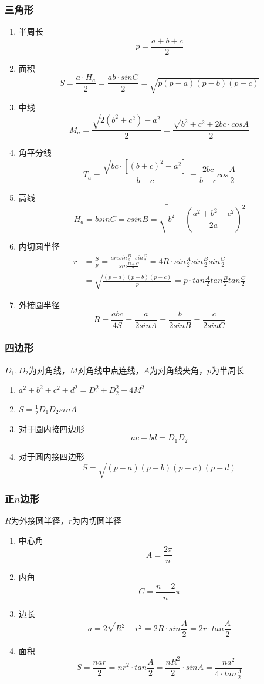 \documentclass[a4paper]{article}
\begin{document}
\subsubsection{三角形}

\begin{enumerate}
	\item 半周长
		$$p=\frac{a+b+c}{2}$$
	\item 面积
		$$S=\frac{a \cdot H_a}{2}=\frac{ab \cdot sinC}{2}=\sqrt{p(p-a)(p-b)(p-c)}$$
	\item 中线
		$$M_a=\frac{\sqrt{2(b^2+c^2)-a^2}}{2}=\frac{\sqrt{b^2+c^2+2bc \cdot cosA}}{2}$$
	\item 角平分线 
		$$T_a=\frac{\sqrt{bc \cdot [(b+c)^2-a^2]}}{b+c}=\frac{2bc}{b+c}cos\frac{A}{2}$$
	\item 高线
		$$H_a=bsinC=csinB=\sqrt{b^2-(\frac{a^2+b^2-c^2}{2a})^2}$$
	\item 内切圆半径
		\begin{align*}
			r&=\frac{S}{p}=\frac{arcsin\frac{B}{2} \cdot sin\frac{C}{2}}{sin\frac{B+C}{2}}=4R \cdot sin\frac{A}{2}sin\frac{B}{2}sin\frac{C}{2}\\
			&=\sqrt{\frac{(p-a)(p-b)(p-c)}{p}}=p \cdot tan\frac{A}{2}tan\frac{B}{2}tan\frac{C}{2}
		\end{align*}
	\item 外接圆半径
		$$R=\frac{abc}{4S}=\frac{a}{2sinA}=\frac{b}{2sinB}=\frac{c}{2sinC}$$
\end{enumerate}

\subsubsection{四边形}

$D_1, D_2$为对角线，$M$对角线中点连线，$A$为对角线夹角，$p$为半周长
\begin{enumerate}
	\item $a^2+b^2+c^2+d^2=D_1^2+D_2^2+4M^2$
	\item $S=\frac{1}{2}D_1D_2sinA$
	\item 对于圆内接四边形
		$$ac+bd=D_1D_2$$
	\item 对于圆内接四边形
		$$S=\sqrt{(p-a)(p-b)(p-c)(p-d)}$$
\end{enumerate}

\subsubsection{正$n$边形}

$R$为外接圆半径，$r$为内切圆半径
\begin{enumerate}
	\item 中心角
		$$A=\frac{2\pi}{n}$$
	\item 内角
		$$C=\frac{n-2}{n}\pi$$
	\item 边长
		$$a=2\sqrt{R^2-r^2}=2R \cdot sin\frac{A}{2}=2r \cdot tan\frac{A}{2}$$
	\item 面积
		$$S=\frac{nar}{2}=nr^2 \cdot tan\frac{A}{2}=\frac{nR^2}{2} \cdot sinA=\frac{na^2}{4 \cdot tan\frac{A}{2}}$$
\end{enumerate}
\end{document}
